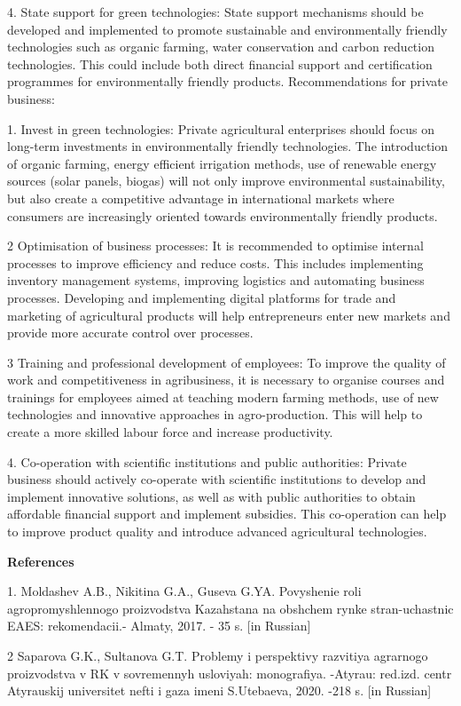 4. State support for green technologies: State support mechanisms should
be developed and implemented to promote sustainable and environmentally
friendly technologies such as organic farming, water conservation and
carbon reduction technologies. This could include both direct financial
support and certification programmes for environmentally friendly
products. Recommendations for private business:

1. Invest in green technologies: Private agricultural enterprises should
focus on long-term investments in environmentally friendly technologies.
The introduction of organic farming, energy efficient irrigation
methods, use of renewable energy sources (solar panels, biogas) will not
only improve environmental sustainability, but also create a competitive
advantage in international markets where consumers are increasingly
oriented towards environmentally friendly products.

2 Optimisation of business processes: It is recommended to optimise
internal processes to improve efficiency and reduce costs. This includes
implementing inventory management systems, improving logistics and
automating business processes. Developing and implementing digital
platforms for trade and marketing of agricultural products will help
entrepreneurs enter new markets and provide more accurate control over
processes.

3 Training and professional development of employees: To improve the
quality of work and competitiveness in agribusiness, it is necessary to
organise courses and trainings for employees aimed at teaching modern
farming methods, use of new technologies and innovative approaches in
agro-production. This will help to create a more skilled labour force
and increase productivity.

4. Co-operation with scientific institutions and public authorities:
Private business should actively co-operate with scientific institutions
to develop and implement innovative solutions, as well as with public
authorities to obtain affordable financial support and implement
subsidies. This co-operation can help to improve product quality and
introduce advanced agricultural technologies.

{\bfseries References}

1. Moldashev A.B., Nikitina G.A., Guseva G.YA. Povyshenie roli
agropromyshlennogo proizvodstva Kazahstana na obshchem rynke
stran-uchastnic EAES: rekomendacii.- Almaty, 2017. - 35 s. {[}in
Russian{]}

2 Saparova G.K., Sultanova G.T. Problemy i perspektivy razvitiya
agrarnogo proizvodstva v RK v sovremennyh usloviyah: monografiya.
-Atyrau: red.izd. centr Atyrauskij universitet nefti i gaza imeni
S.Utebaeva, 2020. -218 s. {[}in Russian{]}

